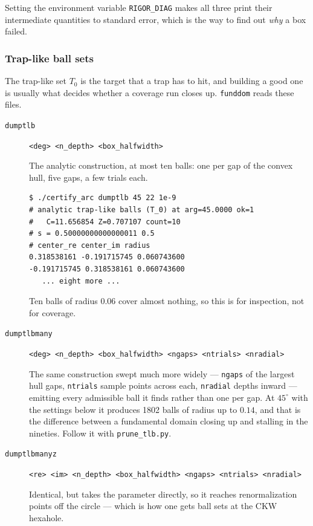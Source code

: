 \documentclass{amsart}
\begin{document}
Setting the environment variable \texttt{RIGOR\_DIAG} makes all three print their intermediate
quantities to standard error, which is the way to find out \emph{why} a box failed.

\subsubsection{Trap-like ball sets}

The trap-like set $T_0$ is the target that a trap has to hit, and building a good one is usually
what decides whether a coverage run closes up.  \texttt{funddom} reads these files.

\begin{description}
\item[\texttt{dumptlb}] \texttt{<deg> <n\_depth> <box\_halfwidth>}


The analytic construction, at most ten balls: one per gap of the convex hull, five gaps, a few
trials each.
\begin{verbatim}
$ ./certify_arc dumptlb 45 22 1e-9
# analytic trap-like balls (T_0) at arg=45.0000 ok=1
#   C=11.656854 Z=0.707107 count=10
# s = 0.50000000000000011 0.5
# center_re center_im radius
0.318538161 -0.191715745 0.060743600
-0.191715745 0.318538161 0.060743600
   ... eight more ...
\end{verbatim}
Ten balls of radius $0.06$ cover almost nothing, so this is for inspection, not for coverage.
\item[\texttt{dumptlbmany}] \texttt{<deg> <n\_depth> <box\_halfwidth> <ngaps> <ntrials> <nradial>}


The same construction swept much more widely --- \texttt{ngaps} of the largest hull gaps,
\texttt{ntrials} sample points across each, \texttt{nradial} depths inward --- emitting every
admissible ball it finds rather than one per gap.  At $45^\circ$ with the settings below it
produces 1802 balls of radius up to $0.14$, and that is the difference between a fundamental
domain closing up and stalling in the nineties.  Follow it with \texttt{prune\_tlb.py}.
\item[\texttt{dumptlbmanyz}] \texttt{<re> <im> <n\_depth> <box\_halfwidth> <ngaps> <ntrials> <nradial>}


Identical, but takes the parameter directly, so it reaches renormalization points off the circle
--- which is how one gets ball sets at the CKW hexahole.
\end{description}
\end{document}
